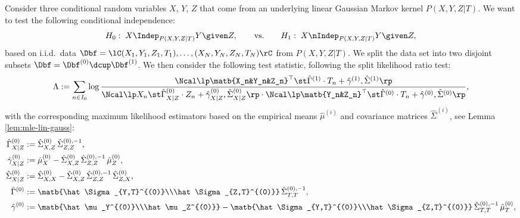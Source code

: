 \begin{Rem}
  Consider three conditional random variables $X$, $Y$, $Z$ that come from an underlying linear Gaussian Markov kernel $P(X,Y,Z|T)$.
  We want to test the following conditional independence:
  \[H_0:\; X \Indep_{P(X,Y,Z|T)} Y \given Z, \qquad \text{vs.} \qquad H_1:\; X \nIndep_{P(X,Y,Z|T)} Y \given Z, \]
  based on i.i.d.\ data $\Dbf = \lC (X_1,Y_1,Z_1,T_1),\dots,(X_N,Y_N,Z_N,T_N) \rC$ from $P(X,Y,Z|T)$.
  We split the data set into two disjoint subsets $\Dbf = \Dbf^{(0)} \dcup \Dbf^{(1)}$.
  We then consider the following test statistic, following the split likelihood ratio test:
  \[ \Lambda := \sum_{n \in I_0}  %
  \log \frac{\Ncal\lp \matb{X_n&Y_n&Z_n}^\top\st \hat\Gamma^{(1)}\cdot T_n+\hat\gamma^{(1)},\hat\Sigma^{(1)}\rp}{ \Ncal\lp X_n\st \hat\Gamma_{X|Z}^{(0)}\cdot Z_n+\hat\gamma_{X|Z}^{(0)},\hat\Sigma_{X|Z}^{(0)}\rp \cdot \Ncal\lp \matb{Y_n&Z_n}^\top\st \hat\Gamma^{(0)}\cdot T_n+\hat\gamma^{(0)},\hat\Sigma^{(0)}\rp },  \]
  with the corresponding maximum likelihood estimators based on the empirical means $\hat\mu^{(i)}$ and covariance matrices $\hat\Sigma^{(i)}$, see Lemma \ref{lem:mle-lin-gauss}:
  \begin{align*}
  \hat\Gamma_{X|Z}^{(0)} &:= \hat\Sigma_{X,Z}^{(0)} \,{\hat\Sigma_{Z,Z}^{(0),-1}},\\
  \hat\gamma_{X|Z}^{(0)} &:= \hat\mu_X^{(0)} - \hat\Sigma_{X,Z}^{(0)} \,{\hat\Sigma_{Z,Z}^{(0),-1}}\,\hat\mu_Z^{(0)},\\
  \hat\Sigma_{X|Z}^{(0)} &:= \hat\Sigma_{X,X}^{(0)} -\hat\Sigma_{X,Z}^{(0)}\,{\hat\Sigma_{Z,Z}^{(0),-1}}\,\hat\Sigma_{Z,X}^{(0)},\\
      \hat\Gamma^{(0)} &:= \matb{\hat\Sigma_{Y,T}^{(0)}\\\hat\Sigma_{Z,T}^{(0)}} \,{\hat\Sigma_{T,T}^{(0),-1}},\\
      \hat\gamma^{(0)} &:= \matb{\hat\mu_Y^{(0)}\\\hat\mu_Z^{(0)}} - \matb{\hat\Sigma_{Y,T}^{(0)}\\\hat\Sigma_{Z,T}^{(0)}} \,{\hat\Sigma_{T,T}^{(0),-1}}\,\hat\mu_T^{(0)}, \\

\end{align*}
\end{Rem}
